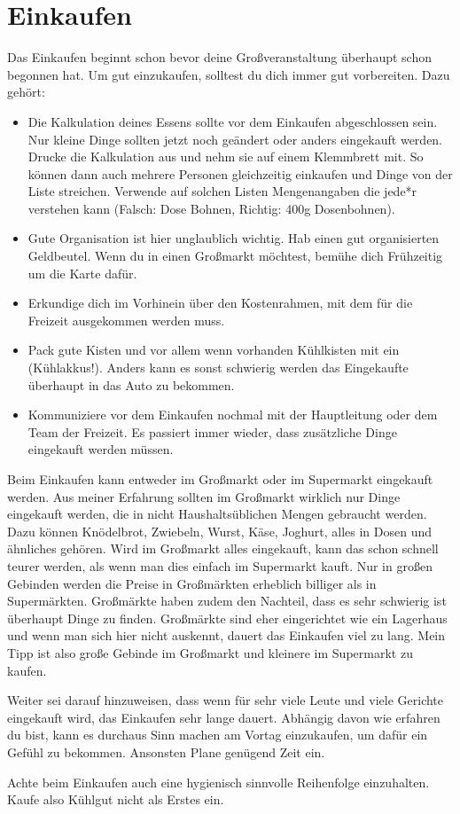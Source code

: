 \section{Einkaufen}\label{sec:einkaufen}
Das Einkaufen beginnt schon bevor deine Großveranstaltung überhaupt schon begonnen hat.
Um gut einzukaufen, solltest du dich immer gut vorbereiten.
Dazu gehört:
\begin{itemize}
    \item Die Kalkulation deines Essens sollte vor dem Einkaufen abgeschlossen sein.
    Nur kleine Dinge sollten jetzt noch geändert oder anders eingekauft werden.
    Drucke die Kalkulation aus und nehm sie auf einem Klemmbrett mit.
    So können dann auch mehrere Personen gleichzeitig einkaufen und Dinge von der Liste streichen.
    Verwende auf solchen Listen Mengenangaben die jede*r verstehen kann (Falsch:  Dose Bohnen\grqq , Richtig: \qlqq 400g Dosenbohnen\grqq).
    \item Gute Organisation ist hier unglaublich wichtig.
    Hab einen gut organisierten Geldbeutel.
    Wenn du in einen Großmarkt möchtest, bemühe dich Frühzeitig um die Karte dafür.
    \item Erkundige dich im Vorhinein über den Kostenrahmen, mit dem für die Freizeit ausgekommen werden muss.
    \item Pack gute Kisten und vor allem wenn vorhanden Kühlkisten mit ein (Kühlakkus!).
    Anders kann es sonst schwierig werden das Eingekaufte überhaupt in das Auto zu bekommen.
    \item Kommuniziere vor dem Einkaufen nochmal mit der Hauptleitung oder dem Team der Freizeit.
    Es passiert immer wieder, dass zusätzliche Dinge eingekauft werden müssen.
\end{itemize}
Beim Einkaufen kann entweder im Großmarkt oder im Supermarkt eingekauft werden.
Aus meiner Erfahrung sollten im Großmarkt wirklich nur Dinge eingekauft werden, die in nicht Haushaltsüblichen Mengen gebraucht werden.
Dazu können Knödelbrot, Zwiebeln, Wurst, Käse, Joghurt, alles in Dosen und ähnliches gehören.
Wird im Großmarkt alles eingekauft, kann das schon schnell teurer werden, als wenn man dies einfach im Supermarkt kauft.
Nur in großen Gebinden werden die Preise in Großmärkten erheblich billiger als in Supermärkten.
Großmärkte haben zudem den Nachteil, dass es sehr schwierig ist überhaupt Dinge zu finden.
Großmärkte sind eher eingerichtet wie ein Lagerhaus und wenn man sich hier nicht auskennt, dauert das Einkaufen viel zu lang.
Mein Tipp ist also große Gebinde im Großmarkt und kleinere im Supermarkt zu kaufen.

Weiter sei darauf hinzuweisen, dass wenn für sehr viele Leute und viele Gerichte eingekauft wird, das Einkaufen sehr lange dauert.
Abhängig davon wie erfahren du bist, kann es durchaus Sinn machen am Vortag einzukaufen, um dafür ein Gefühl zu bekommen.
Ansonsten Plane genügend Zeit ein.

Achte beim Einkaufen auch eine hygienisch sinnvolle Reihenfolge einzuhalten.
Kaufe also Kühlgut nicht als Erstes ein.